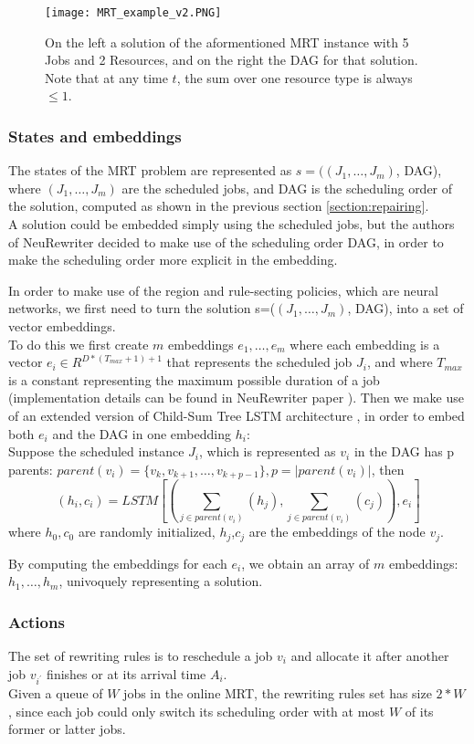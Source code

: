 \documentclass[12pt]{article}
\begin{document}
\begin{figure}[H]
    \centering
    \texttt{[image: MRT\_example\_v2.PNG]}
    \caption{On the left a solution of the aformentioned MRT instance with 5 Jobs and 2 Resources, and on the right the DAG for that solution. Note that 
    at any time $t$, the sum over one resource type is always $\le 1$.}
    \label{img:mrt_example}
\end{figure}

\medbreak
\subsubsection{States and embeddings}
\label{sec:states_repairing}
The states of the MRT problem are represented as $s=((J_1,\dots,J_m)$, DAG), where $(J_1,\dots,J_m)$ are the scheduled jobs, and DAG is the scheduling order of the solution, computed as shown in the previous section \ref{section:repairing}.\\
A solution could be embedded simply using the scheduled jobs, but the authors of NeuRewriter decided to make use of the scheduling order DAG, in order to make the scheduling order more explicit in the embedding.

\medbreak
In order to make use of the region and rule-secting policies, which are neural networks, we first need to turn the solution s=($(J_1,\dots,J_m)$, DAG), into a set of vector embeddings.\\
To do this we first create $m$ embeddings $e_1,\dots,e_m$ where each embedding is a vector $e_i \in R^{D*(T_{max}+1)+1}$ that represents the scheduled job $J_i$, and where $T_{max}$ is a constant 
representing the maximum possible duration of a job (implementation details can be found in NeuRewriter paper \cite{neu_rewriter}). Then we make use of an extended version of Child-Sum Tree LSTM architecture \cite{lstm_tree}, in order to embed both $e_i$ and the DAG in one embedding $h_i$:\\
Suppose the scheduled instance $J_i$, which is represented as $v_i$ in the DAG has p parents: $parent(v_i) = \{v_k,v_{k+1},\dots,v_{k+p-1}\}, p = |parent(v_i)|$, then $$(h_i,c_i) = LSTM[(\sum_{j \in parent(v_i)}(h_j), \sum_{j \in parent(v_i)}(c_j)), e_i]$$
where $h_0, c_0$ are randomly initialized, $h_j$,$c_j$ are the embeddings of the node $v_j$.

By computing the embeddings for each $e_i$, we obtain an array of $m$ embeddings: $h_1,\dots,h_m$, univoquely representing a solution.

\medbreak
\subsubsection{Actions}
The set of rewriting rules is to reschedule a job $v_i$ and allocate it after another job $v_{i^{'}}$ finishes or at its arrival time $A_i$.\\
Given a queue of $W$ jobs in the online MRT, the rewriting rules set has size $2*W$, since each job could only switch its scheduling order with at most $W$ of its former or latter jobs. \cite{neu_rewriter}
\end{document}
